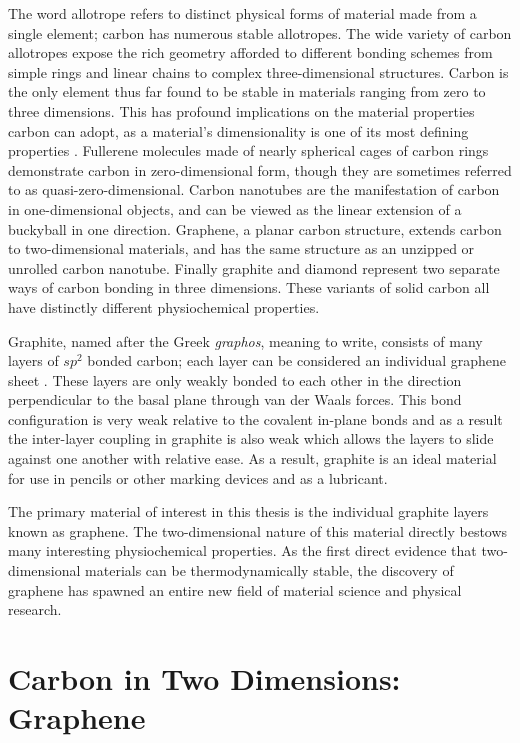 The word allotrope refers to distinct physical forms of material made from a single element; carbon has numerous stable allotropes. The wide variety of carbon allotropes expose the rich geometry afforded to different bonding schemes from simple rings and linear chains to complex three-dimensional structures. Carbon is the only element thus far found to be stable in materials ranging from zero to three dimensions. This has profound implications on the material properties carbon can adopt, as a material's dimensionality is one of its most defining properties \cite{novoselov-2d}. Fullerene molecules made of nearly spherical cages of carbon rings demonstrate carbon in zero-dimensional form, though they are sometimes referred to as quasi-zero-dimensional. Carbon nanotubes are the manifestation of carbon in one-dimensional objects, and can be viewed as the linear extension of a buckyball in one direction. Graphene, a planar carbon structure, extends carbon to two-dimensional materials, and has the same structure as an unzipped or unrolled carbon nanotube. Finally graphite and diamond represent two separate ways of carbon bonding in three dimensions. These variants of solid carbon all have distinctly different physiochemical properties.

Graphite, named after the Greek \emph{graphos}, meaning to write, consists of many layers of $sp^2$ bonded carbon; each layer can be considered an individual graphene sheet \cite{history-thermodynamics}. These layers are only weakly bonded to each other in the direction perpendicular to the basal plane through van der Waals forces. This bond configuration is very weak relative to the covalent in-plane bonds and as a result the inter-layer coupling in graphite is also weak which allows the layers to slide against one another with relative ease. As a result, graphite is an ideal material for use in pencils or other marking devices and as a lubricant.

The primary material of interest in this thesis is the individual graphite layers known as graphene. The two-dimensional nature of this material directly bestows many interesting physiochemical properties. As the first direct evidence that two-dimensional materials can be thermodynamically stable, the discovery of graphene has spawned an entire new field of material science and physical research.

\section{Carbon in Two Dimensions: Graphene}

